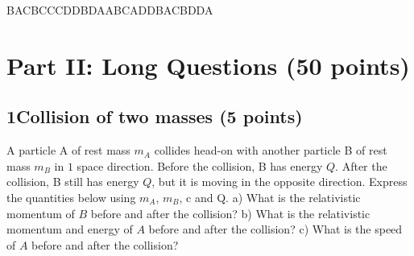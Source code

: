 \documentclass[12pt]{book} %
\numberwithin{equation}{chapter}
\def\mc{\hspace{0.5cm}}
\def\lq{\hspace{2.5ex}}
\begin{document}
\begin{solbox}
BACBC\mc CCDDB\mc DAABC\mc ADDBA\mc CBDDA
\end{solbox}

\section*{Part II: Long Questions (50 points)}
\subsection*{1\lq Collision of two masses (5 points)}
A particle A of rest mass $m_{A}$ collides head-on with another particle B of rest mass $m_{B}$ in $1$ space direction. Before the collision, B has energy $Q$. After the collision, B still has energy $Q$, but it is moving in the opposite direction. Express the quantities below using $m_{A}$, $m_{B}$, c and Q.\bigskip\newline
a) What is the relativistic momentum of $B$ before and after the collision?\bigskip\newline
b) What is the relativistic momentum and energy of $A$ before and after the collision?\bigskip\newline
c) What is the speed of $A$ before and after the collision?
\end{document}
